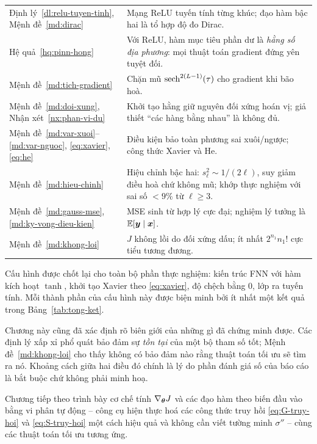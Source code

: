 \begin{longtable}{@{}l p{8.2cm}@{}}
Định lý~\ref{dl:relu-tuyen-tinh}, Mệnh đề~\ref{md:dirac}
  & Mạng ReLU tuyến tính từng khúc; đạo hàm bậc hai là tổ hợp độ đo Dirac. \\
Hệ quả~\ref{hq:pinn-hong}
  & Với ReLU, hàm mục tiêu phần dư là \emph{hằng số địa phương}: mọi thuật toán
    gradient đứng yên tuyệt đối. \\
Mệnh đề~\ref{md:tich-gradient}
  & Chặn mũ $\operatorname{sech}^{2(L-1)}(\tau)$ cho gradient khi bão hoà. \\
Mệnh đề~\ref{md:doi-xung}, Nhận xét~\ref{nx:phan-vi-du}
  & Khởi tạo hằng giữ nguyên đối xứng hoán vị; giả thiết ``các hàng bằng nhau''
    là không đủ. \\
Mệnh đề~\ref{md:var-xuoi}--\ref{md:var-nguoc}, \eqref{eq:xavier}, \eqref{eq:he}
  & Điều kiện bảo toàn phương sai xuôi/ngược; công thức Xavier và He. \\
Mệnh đề~\ref{md:hieu-chinh}
  & Hiệu chỉnh bậc hai: $s_\ell^2 \sim 1/(2\ell)$, suy giảm điều hoà chứ không
    mũ; khớp thực nghiệm với sai số $< 9\%$ từ $\ell \ge 3$. \\
Mệnh đề~\ref{md:gauss-mse}, \ref{md:ky-vong-dieu-kien}
  & MSE sinh từ hợp lý cực đại; nghiệm lý tưởng là $\mathbb{E}[\bm{y}\mid\bm{x}]$. \\
Mệnh đề~\ref{md:khong-loi}
  & $J$ không lồi do đối xứng dấu; ít nhất $2^{n_1}n_1!$ cực tiểu tương đương.
\end{longtable}
\endgroup
 
Cấu hình được chốt lại cho toàn bộ phần thực nghiệm: kiến trúc FNN với hàm kích
hoạt $\tanh$, khởi tạo Xavier theo \eqref{eq:xavier}, độ chệch bằng $0$,
lớp ra tuyến tính. Mỗi thành phần của cấu hình này được biện minh bởi ít nhất
một kết quả trong Bảng~\ref{tab:tong-ket}.
 
Chương này cũng đã xác định rõ biên giới của những gì đã chứng minh được. Các
định lý xấp xỉ phổ quát bảo đảm sự \emph{tồn tại} của một bộ tham số tốt;
Mệnh đề~\ref{md:khong-loi} cho thấy không có bảo đảm nào rằng thuật toán tối ưu
sẽ tìm ra nó. Khoảng cách giữa hai điều đó chính là lý do phần đánh giá số của
báo cáo là bắt buộc chứ không phải minh hoạ.
 
Chương tiếp theo trình bày cơ chế tính $\nabla_{\bm{\theta}} J$ và các đạo hàm theo
biến đầu vào bằng vi phân tự động -- công cụ hiện thực hoá các công thức truy hồi
\eqref{eq:G-truy-hoi} và \eqref{eq:S-truy-hoi} một cách hiệu quả và không cần
viết tường minh $\sigma''$ -- cùng các thuật toán tối ưu tương ứng.
 